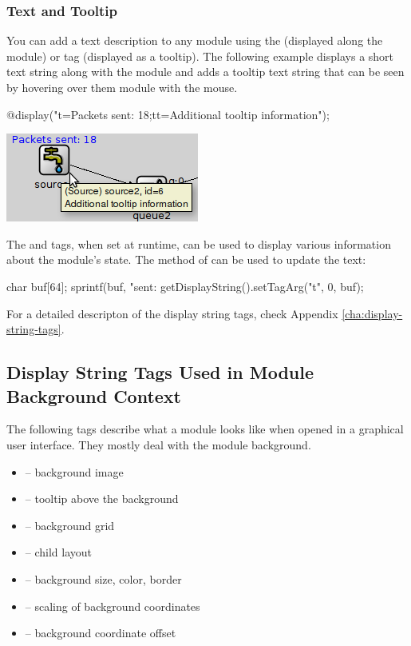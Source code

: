 \subsubsection{Text and Tooltip}

You can add a text description to any module using the 
(displayed along the module) or  tag (displayed as a tooltip).
The following example displays a short text string along with the module
and adds a tooltip text string that can be seen by hovering over
them module with the mouse.

\begin{ned}
@display("t=Packets sent: 18;tt=Additional tooltip information");
\end{ned}

\begin{center}
\includegraphics{figures/graphics-ttag}
\end{center}

\begin{note}
  The  and  tags, when set at runtime, can be used to display
  various information about the module's state. The  method
  of  can be used to update the text:

  \begin{cpp}
char buf[64];
sprintf(buf, "sent: %
getDisplayString().setTagArg("t", 0, buf);
  \end{cpp}

\end{note}

For a detailed descripton of the display string tags, check
Appendix \ref{cha:display-string-tags}.

\subsection{Display String Tags Used in Module Background Context}

The following tags describe what a module looks like when opened in
a graphical user interface. They mostly deal with the module background.

\begin{itemize}
  \item {} -- background image
  \item {} -- tooltip above the background
  \item {} -- background grid
  \item {} -- child layout
  \item {} -- background size, color, border
  \item {} -- scaling of background coordinates
  \item {} -- background coordinate offset
\end{itemize}

